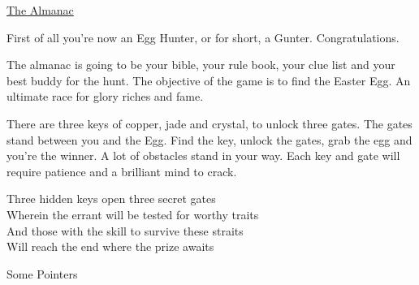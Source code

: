 \documentclass[a4paper]{article}
\newcommand{\row}{\vspace{5mm}}
\newcommand{\white}[1]{\textcolor{white}{\fontsize{1}{1.2}\selectfont{#1}}}
\begin{document}
\begin{center}
\Large{\underline{The Almanac}}
\end{center}

\newenvironment{noSepEnumerate}
{ \begin{enumerate}
    \setlength{\itemsep}{1pt}
    \setlength{\parskip}{0pt}
    \setlength{\parsep}{0pt}}
{ \end{enumerate}}
First of all you're now an Egg Hunter, or for short, a Gunter. Congratulations.

\row
The almanac is going to be your bible, your rule book, your clue list and your best buddy for the hunt. The objective of the game is to find the Easter Egg. An ultimate race for glory riches and fame.

There are three keys of copper, jade and crystal, to unlock three gates. The gates stand between you and the Egg. Find the key, unlock the gates, grab the egg and you're the winner. A lot of obstacles stand in your way. Each key and gate will require patience and a brilliant mind to crack.

\row
\begin{centering}
Three hidden keys open three secret gates \\
Wherein the errant will be tested for worthy traits \\
And those with the skill to survive these straits \\
Will reach the end where the prize awaits \\
\end{centering}  

\row
\begin{flushleft}
Some Pointers
\end{flushleft}
\end{document}
